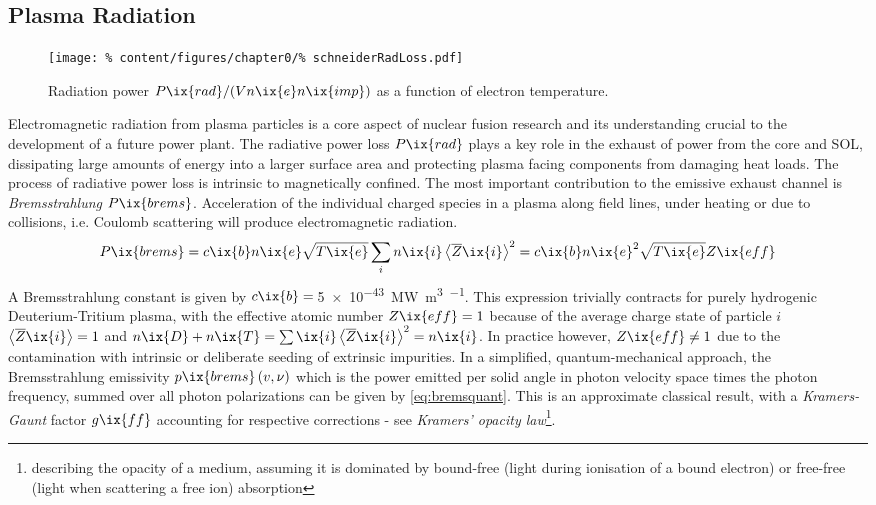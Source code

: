         \subsection{Plasma Radiation}\label{subsec:radiation}%
%
            \begin{figure}[t]%
                \centering%
                \texttt{[image: \%
                    content/figures/chapter0/\%
                    schneiderRadLoss.pdf]}%
                \caption{%
                    Radiation power $P\ix{rad}/(Vn\ix{e}n\ix{imp})$ as a function of electron temperature.\cite{Schneider2006}}\label{fig:radLossCool}%
            \end{figure}%
%
            Electromagnetic radiation from plasma particles is a core aspect of nuclear fusion research and its understanding crucial to the development of a future power plant. The radiative power loss $P\ix{rad}$ plays a key role in the exhaust of power from the core and SOL, dissipating large amounts of energy into a larger surface area and protecting plasma facing components from damaging heat loads. The process of radiative power loss is intrinsic to magnetically confined. The most important contribution to the emissive exhaust channel is \textit{Bremsstrahlung} $P\ix{brems}$. Acceleration of the individual charged species in a plasma along field lines, under heating or due to collisions, i.e. Coulomb scattering will produce electromagnetic radiation.%
%
            \begin{align}%
                P\ix{brems}=c\ix{b}n\ix{e}\sqrt{T\ix{e}}\sum_{i}n\ix{i}\left\langle\overline{Z}\ix{i}\right\rangle^{2}=c\ix{b}n\ix{e}^{2}\sqrt{T\ix{e}}Z\ix{eff}\label{eq:brems}%
            \end{align}%
%
            A Bremsstrahlung constant is given by $c\ix{b}=\,$\SI{5e-43}{\mega\watt\cubic\meter\per\sqrt{\kilo\electronvolt}}\cite{Meade1974}. This expression trivially contracts for purely hydrogenic Deuterium-Tritium plasma, with the effective atomic number $Z\ix{eff}=1$ because of the average charge state of particle $i$ $\left\langle\overline{Z}\ix{i}\right\rangle=1$ and $n\ix{D}+n\ix{T}=\sum\ix{i}\left\langle\overline{Z}\ix{i}\right\rangle^{2}=n\ix{i}$. In practice however, $Z\ix{eff}\neq1$ due to the contamination with intrinsic or deliberate seeding of extrinsic impurities. In a simplified, quantum-mechanical approach, the Bremsstrahlung emissivity $p\ix{brems}\left(v,\nu\right)$ which is the power emitted per solid angle in photon velocity space times the photon frequency, summed over all photon polarizations can be given by \cref{eq:bremsquant}. This is an approximate classical result, with a \textit{Kramers-Gaunt} factor $g\ix{ff}$ accounting for respective corrections - see \textit{Kramers' opacity law}\footnote[1]{describing the opacity of a medium, assuming it is dominated by bound-free (light during ionisation of a bound electron) or free-free (light when scattering a free ion) absorption}.%
